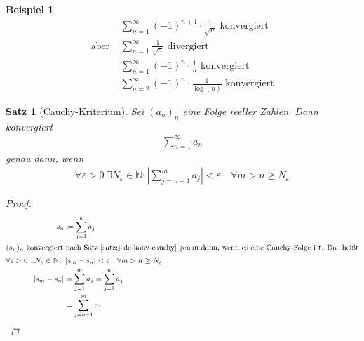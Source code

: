 \documentclass[11pt, twoside, a4paper]{article}
\theoremstyle{plain}
\newtheorem{satz}[blockelement]{Satz}
\newtheorem{beispiel}[blockelement]{Beispiel}
\newcommand{\pair}[1]{\left(#1\right)}
\newcommand{\abs}[1]{\left|#1\right|}
\newcommand{\definedas}[0]{\coloneqq}
\newcommand{\naturalnumbers}{\mathbb{N}}
\begin{document}
    \begin{beispiel}
        \begin{align*}
            &\sum_{n=1}^{\infty} \pair{-1}^{n+1} \cdot \frac{1}{\sqrt{n}}\text{ konvergiert}\\
            \text{aber } &\sum_{n=1}^{\infty} \frac{1}{\sqrt {n}} \text{ divergiert}\\
            &\sum_{n=1}^{\infty} (-1)^{n} \cdot \frac{1}{n}\text{ konvergiert}\\
            &\sum_{n=2}^{\infty} (-1)^n \cdot \frac{1}{\log\pair{n}}\text{ konvergiert}
        \end{align*}
    \end{beispiel}

    \begin{satz}[Cauchy-Kriterium] %
        \label{satz:cauchy-kriterium}
        Sei $(a_n)_n$ eine Folge reeller Zahlen. Dann konvergiert
        \begin{align*}
            \sum_{n=1}^{\infty} a_n
        \end{align*}
        genau dann, wenn
        \begin{align*}
            \forall \varepsilon > 0~\exists N_{\varepsilon}\in\naturalnumbers\colon \abs{\sum_{j=n+1}^{m} a_j} <\varepsilon\quad\forall m>n\geq N_{\varepsilon}
        \end{align*}
        \begin{proof}
            \begin{align*}
                s_n &\definedas \sum_{j=1}^{n} a_j\\
                \intertext{$(s_n)_n$ konvergiert nach Satz~\ref{satz:jede-konv-cauchy} genau dann, wenn es eine Cauchy-Folge ist. Das heißt}
                \forall\varepsilon > 0~\exists N_{\varepsilon}\in\naturalnumbers\colon &\abs{s_{m} - s_{n}} < \varepsilon\quad\forall m> n \geq N_{\varepsilon}\\
                \abs{s_m - s_n} &= \sum_{j=1}^{m} a_j = \sum_{j=1}^{n} a_j\\
                &= \sum_{j=n+1}^{m} a_j\qedhere
            \end{align*}
        \end{proof}
    \end{satz}
\end{document}
